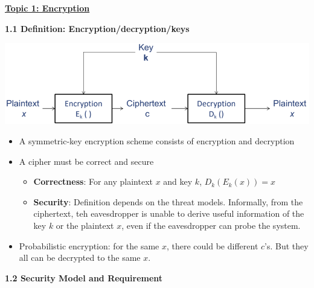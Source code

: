 \documentclass[landscape,a4paper]{extarticle}
\newenvironment{Figure}
  {\par\noindent\minipage{\linewidth}}
  {\endminipage\par\medskip}
\begin{document}
\begin{multicols*}{5}
    \textbf{\uline{Topic 1: Encryption}}

    \textbf{1.1 Definition: Encryption/decryption/keys}

    \begin{Figure}
        \centering
        \includegraphics[width=\linewidth]{symmetric_key_encryption.png}
    \end{Figure}

    \begin{itemize}
        \item A symmetric-key encryption scheme consists of encryption and decryption
        \item A cipher must be correct and secure
        \begin{itemize}
            \item \textbf{Correctness}: For any plaintext $x$ and key $k$, $D_k(E_k(x)) = x$
            \item \textbf{Security}: Definition depends on the threat models. Informally,
            from the ciphertext, teh eavesdropper is unable to derive useful information of the
            key $k$ or the plaintext $x$, even if the eavesdropper can probe the system.
        \end{itemize}
        \item Probabilistic encryption: for the same $x$, there could be different $c$'s.
        But they all can be decrypted to the same $x$.
    \end{itemize}


    \textbf{1.2 Security Model and Requirement}
    

\end{multicols*}
\end{document}
